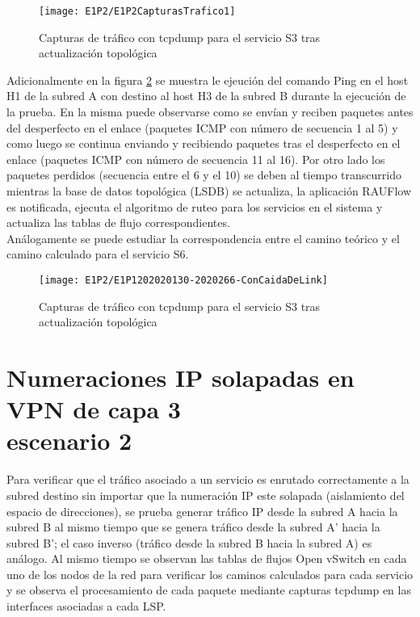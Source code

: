 \newpage
\begin{figure}[ht!] 
\centering    
\texttt{[image: E1P2/E1P2CapturasTrafico1]}
\caption[Capturas de tr\'afico con tcpdump para el servicio S3 tras actualización topol\'ogica]{Capturas de tr\'afico con tcpdump para el servicio S3 tras actualización topol\'ogica}
\label{fig:LabE1P1CapsTraf3}
\end{figure}

Adicionalmente en la figura \ref{fig:LabE1P2CapHost} se muestra le ejeuci\'on del comando Ping en el host H1 de la subred A con destino al host H3 de la subred B durante la ejecuci\'on de la prueba. En la misma puede observarse como se envían y reciben paquetes antes del desperfecto en el enlace (paquetes ICMP con n\'umero de secuencia 1 al 5) y como luego se continua enviando y recibiendo paquetes tras el desperfecto en el enlace (paquetes ICMP con n\'umero de secuencia 11 al 16). Por otro lado los paquetes perdidos (secuencia entre el 6 y el 10) se deben al tiempo transcurrido mientras la base de datos topol\'ogica (LSDB) se actualiza, la aplicaci\'on RAUFlow es notificada, ejecuta el algoritmo de ruteo para los servicios en el sistema y actualiza las tablas de flujo correspondientes.   \\

Análogamente se puede estudiar la correspondencia entre el camino te\'orico y el camino calculado para el servicio S6.\\

\begin{figure}[ht!] 
\centering    
\texttt{[image: E1P2/E1P1202020130-2020266-ConCaidaDeLink]}
\caption[Capturas de tr\'afico con tcpdump para el servicio S3 tras actualización topol\'ogica]{Capturas de tr\'afico con tcpdump para el servicio S3 tras actualización topol\'ogica}
\label{fig:LabE1P2CapHost}
\end{figure}

\section{Numeraciones IP solapadas en VPN de capa 3 \\ escenario 2}
\label{appendix6.4}
Para verificar que el tr\'afico asociado a un servicio es enrutado correctamente a la subred destino sin importar que la numeración IP este solapada (aislamiento del espacio de direcciones), se prueba generar tr\'afico IP desde la subred A hacia la subred B al mismo tiempo que se genera tr\'afico desde la subred A' hacia la subred B'; el caso inverso (tr\'afico desde la subred B hacia la subred A) es an\'alogo. Al mismo tiempo se observan las tablas de flujos Open vSwitch en cada uno de los nodos de la red para verificar los caminos calculados para cada servicio y se observa el procesamiento de cada paquete mediante capturas tcpdump en las interfaces asociadas a cada LSP.\\

